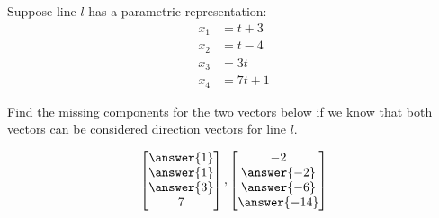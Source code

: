 \documentclass{ximera}
\begin{document}
\begin{problem}\label{prob:directionvect2}
Suppose line $l$ has a parametric representation:
\begin{align*}
x_1&=t+3\\
x_2&=t-4\\
x_3&=3t\\
x_4&=7t+1
\end{align*}
 
Find the missing components for the two vectors below if we know that both vectors can be considered  direction vectors for line $l$.
 
$$\begin{bmatrix}\answer{1}\\\answer{1}\\\answer{3}\\7\end{bmatrix},\begin{bmatrix}-2\\\answer{-2}\\\answer{-6}\\\answer{-14}\end{bmatrix}$$
\end{problem}
\end{document}
